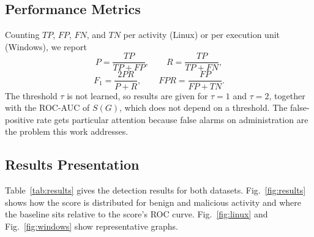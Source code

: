 \documentclass[conference]{IEEEtran}
\begin{document}
\subsection{Performance Metrics}
Counting $TP$, $FP$, $FN$, and $TN$ per activity (Linux) or per execution
unit (Windows), we report
\begin{equation}
P=\frac{TP}{TP+FP},\qquad R=\frac{TP}{TP+FN},
\end{equation}
\begin{equation}
F_1=\frac{2PR}{P+R},\qquad \mathit{FPR}=\frac{FP}{FP+TN}.
\end{equation}
The threshold $\tau$ is not learned, so results are given for $\tau=1$ and
$\tau=2$, together with the ROC-AUC of $S(G)$, which does not depend on a
threshold. The false-positive rate gets particular attention because false
alarms on administration are the problem this work addresses.

\subsection{Results Presentation}
\begin{table}[t]
\caption{Detection performance: name-based baseline vs. provenance behaviour score}\label{tab:results}
\centering\footnotesize\setlength{\tabcolsep}{3.5pt}
\end{table}
Table~\ref{tab:results} gives the detection results for both datasets.
Fig.~\ref{fig:results} shows how the score is distributed for benign and
malicious activity and where the baseline sits relative to the score's ROC
curve. Fig.~\ref{fig:linux} and Fig.~\ref{fig:windows} show representative
graphs.
\end{document}
